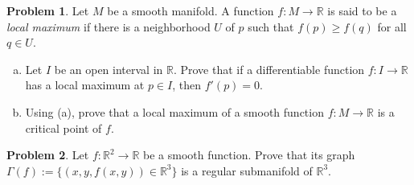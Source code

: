\documentclass{amsart}
\newcommand{\+}[1]{\ensuremath{\mathbf{#1}}}
\newcommand{\R}{{\mathbb R}}
\theoremstyle{definition}
\newtheorem{prob}{Problem}
\begin{document}
\begin{prob}
Let $M$ be a smooth manifold.
A function $f: M \to \R$ is said to be a \emph{local maximum}
if there is a neighborhood $U$ of $p$ such that
$f(p) \geq f(q)$ for all $q \in U$.
\begin{enumerate}[(a)]
 \item Let $I$ be an open interval in $\R$.
 Prove that if a differentiable function $f:I \to \R$ has a local maximum at $p \in I$,
 then $f'(p) = 0$.
 \item Using (a), prove that a local maximum of a smooth function $f:M \to \R$ is a
 critical point of $f$.
\end{enumerate}
\end{prob}

\begin{prob}
 Let $f: \R^2 \to \R$ be a smooth function.  Prove that its graph $\Gamma(f) := \{(x,y,f(x,y)) \in \R^3 \}$
is a regular submanifold of $\R^3$.
\end{prob}
\end{document}
